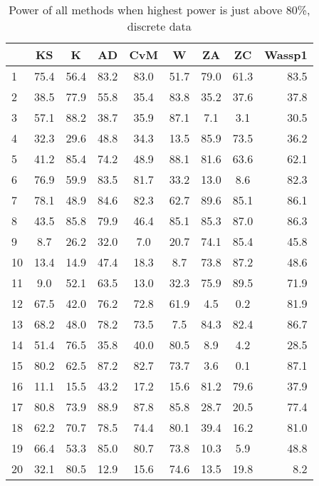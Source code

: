 \documentclass[]{svjour3}
\begin{document}
\begin{table}[H]
\begin{center}
\caption{Power of all methods when highest power is just above 80\%, discrete data}
\label{tab:table5}
\begin{tabular}{l|c|c|c|c|c|c|c|r}
 & KS & K & AD & CvM & W & ZA & ZC & Wassp1\\
\hline
1 & 75.4 & 56.4 & 83.2 & 83.0 & 51.7 & 79.0 & 61.3 & 83.5 \\
2 & 38.5 & 77.9 & 55.8 & 35.4 & 83.8 & 35.2 & 37.6 & 37.8 \\
3 & 57.1 & 88.2 & 38.7 & 35.9 & 87.1 & 7.1 & 3.1 & 30.5 \\
4 & 32.3 & 29.6 & 48.8 & 34.3 & 13.5 & 85.9 & 73.5 & 36.2 \\
5 & 41.2 & 85.4 & 74.2 & 48.9 & 88.1 & 81.6 & 63.6 & 62.1 \\
6 & 76.9 & 59.9 & 83.5 & 81.7 & 33.2 & 13.0 & 8.6 & 82.3 \\
7 & 78.1 & 48.9 & 84.6 & 82.3 & 62.7 & 89.6 & 85.1 & 86.1 \\
8 & 43.5 & 85.8 & 79.9 & 46.4 & 85.1 & 85.3 & 87.0 & 86.3 \\
9 & 8.7 & 26.2 & 32.0 & 7.0 & 20.7 & 74.1 & 85.4 & 45.8 \\
10 & 13.4 & 14.9 & 47.4 & 18.3 & 8.7 & 73.8 & 87.2 & 48.6 \\
11 & 9.0 & 52.1 & 63.5 & 13.0 & 32.3 & 75.9 & 89.5 & 71.9 \\
12 & 67.5 & 42.0 & 76.2 & 72.8 & 61.9 & 4.5 & 0.2 & 81.9 \\
13 & 68.2 & 48.0 & 78.2 & 73.5 & 7.5 & 84.3 & 82.4 & 86.7 \\
14 & 51.4 & 76.5 & 35.8 & 40.0 & 80.5 & 8.9 & 4.2 & 28.5 \\
15 & 80.2 & 62.5 & 87.2 & 82.7 & 73.7 & 3.6 & 0.1 & 87.1 \\
16 & 11.1 & 15.5 & 43.2 & 17.2 & 15.6 & 81.2 & 79.6 & 37.9 \\
17 & 80.8 & 73.9 & 88.9 & 87.8 & 85.8 & 28.7 & 20.5 & 77.4 \\
18 & 62.2 & 70.7 & 78.5 & 74.4 & 80.1 & 39.4 & 16.2 & 81.0 \\
19 & 66.4 & 53.3 & 85.0 & 80.7 & 73.8 & 10.3 & 5.9 & 48.8 \\
20 & 32.1 & 80.5 & 12.9 & 15.6 & 74.6 & 13.5 & 19.8 & 8.2 \\
\end{tabular}
\end{center}
\end{table}
\end{document}

